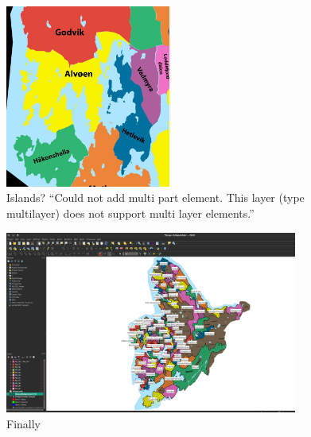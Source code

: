 
\begin{frame}
    \begin{figure}
        \centering
        \includegraphics[height = 6cm]{images/qgis_islands.jpg}%
        \caption{Islands? \enquote{Could not add multi part element. This layer (type multilayer) does not support multi layer elements.}}
    \end{figure}
\end{frame}

\begin{frame}
    \begin{figure}
        \centering
        \includegraphics[height = 6cm]{images/qgisOverview.png}%
        \caption{Finally}
    \end{figure}
\end{frame}


